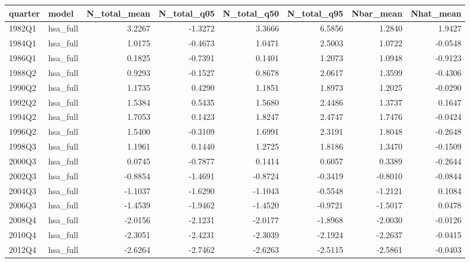 \begin{tabular}{llrrrrrr}
\toprule
quarter & model & N\_total\_mean & N\_total\_q05 & N\_total\_q50 & N\_total\_q95 & Nbar\_mean & Nhat\_mean \\
\midrule
1982Q1 & hsa\_full & 3.2267 & -1.3272 & 3.3666 & 6.5856 & 1.2840 & 1.9427 \\
1984Q1 & hsa\_full & 1.0175 & -0.4673 & 1.0471 & 2.5003 & 1.0722 & -0.0548 \\
1986Q1 & hsa\_full & 0.1825 & -0.7391 & 0.1401 & 1.2073 & 1.0948 & -0.9123 \\
1988Q2 & hsa\_full & 0.9293 & -0.1527 & 0.8678 & 2.0617 & 1.3599 & -0.4306 \\
1990Q2 & hsa\_full & 1.1735 & 0.4290 & 1.1851 & 1.8973 & 1.2025 & -0.0290 \\
1992Q2 & hsa\_full & 1.5384 & 0.5435 & 1.5680 & 2.4486 & 1.3737 & 0.1647 \\
1994Q2 & hsa\_full & 1.7053 & 0.1423 & 1.8247 & 2.4747 & 1.7476 & -0.0424 \\
1996Q2 & hsa\_full & 1.5400 & -0.3109 & 1.6991 & 2.3191 & 1.8048 & -0.2648 \\
1998Q3 & hsa\_full & 1.1961 & 0.1440 & 1.2725 & 1.8186 & 1.3470 & -0.1509 \\
2000Q3 & hsa\_full & 0.0745 & -0.7877 & 0.1414 & 0.6057 & 0.3389 & -0.2644 \\
2002Q3 & hsa\_full & -0.8854 & -1.4691 & -0.8724 & -0.3419 & -0.8010 & -0.0844 \\
2004Q3 & hsa\_full & -1.1037 & -1.6290 & -1.1043 & -0.5548 & -1.2121 & 0.1084 \\
2006Q3 & hsa\_full & -1.4539 & -1.9462 & -1.4520 & -0.9721 & -1.5017 & 0.0478 \\
2008Q4 & hsa\_full & -2.0156 & -2.1231 & -2.0177 & -1.8968 & -2.0030 & -0.0126 \\
2010Q4 & hsa\_full & -2.3051 & -2.4231 & -2.3039 & -2.1924 & -2.2637 & -0.0415 \\
2012Q4 & hsa\_full & -2.6264 & -2.7462 & -2.6263 & -2.5115 & -2.5861 & -0.0403 \\
\bottomrule
\end{tabular}
